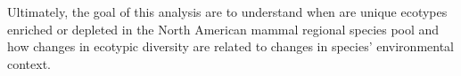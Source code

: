 \documentclass[12pt,letterpaper]{article}
\begin{document}
%
%






Ultimately, the goal of this analysis are to understand when are unique ecotypes enriched or depleted in the North American mammal regional species pool and how changes in ecotypic diversity are related to changes in species' environmental context.
\end{document}
